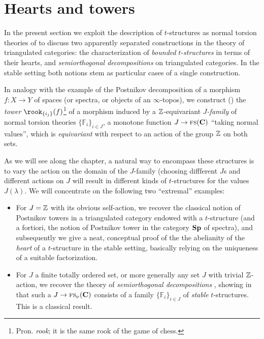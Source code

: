 \chapter{Hearts and towers}\label{chap:hearts}
\thispagestyle{empty}

In the present section we exploit the description of $t$\hyp{}structures as normal torsion theories of \achap {} to discuss two apparently separated constructions in the theory of triangulated categories: the characterization of \emph{bounded} $t$\hyp{}\emph{structures} in terms of their hearts, and \emph{semiorthogonal decompositions} on triangulated categories. In the stable setting both notions stem as particular cases of a single construction. 

In analogy with the example of the Postnikov decomposition of a morphism $f\colon X\to Y$ of spaces (or spectra, or objects of an $\infty$\hyp{}topos), we construct (\adef {}) the \emph{tower} $\rook_{\{i_j\}}(f)$\footnote{Pron. \emph{rook}; it is the same rook of the game of chess.} of a morphism induced by a $\mathbb{Z}$\hyp{}equivariant \emph{$J$\hyp{}family} of normal torsion theories $\{\mathbb{F}_i\}_{i\in J}$, \ie a monotone function $J \to\text{\scshape fs}(\textbf{C})$ ``taking normal values'', which is \emph{equivariant} with respect to an action of the group $\mathbb{Z}$ on both sets.

As we will see along the chapter, a natural way to encompass these structures is to vary the action on the domain of the $J$\hyp{}family (choosing diffferent $J$s and different actions on $J$ will result in different kinds of $t$\hyp{}structures for the values $J(\lambda)$. We will concentrate on the following two ``extremal'' examples:
\begin{itemize}
\item For $J=\mathbb{Z}$ with its obvious self\hyp{}action, we recover the classical notion of Postnikov towers in a triangulated category endowed with a $t$\hyp{}structure (and a fortiori, the notion of Postnikov tower in the category $\textbf{Sp}$ of spectra), and subsequently we give a neat, conceptual proof of the the abelianity of the \emph{heart} of a $t$\hyp{}structure in the stable setting, basically relying on the uniqueness of a suitable factorization. 

\item For $J$ a finite totally ordered set, or more generally any set $J$ with trivial $\mathbb{Z}$\hyp{}action, we recover the theory of \emph{semiorthogonal decompositions} \cite{Bondal1995, Kuz}, showing in \athm {} that such a $J\to \text{\scshape fs}_\nu(\textbf{C})$ consists of a family $\{\mathbb{F}_i\}_{i\in J}$ of \emph{stable} $t$\hyp{}structures. This is a classical result.
\end{itemize}
